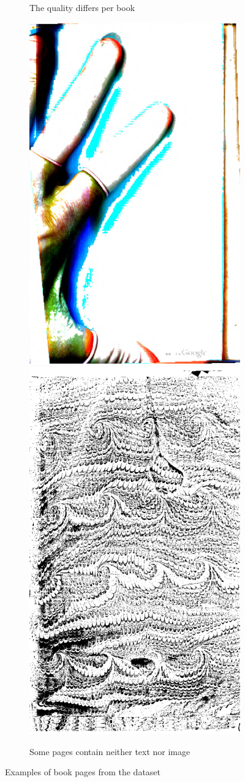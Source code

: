 \begin{figure}[H]
\begin{subfigure}[b]{0.49\textwidth}
		\caption{The quality differs per book}
		\label{fig:qualityExamples}
	\end{subfigure}
	\begin{subfigure}[b]{0.49\textwidth}
		\includegraphics[width=.49\textwidth]{resources/500_0002}
		\includegraphics[width=.49\textwidth]{resources/500_0004}
		\caption{Some pages contain neither text nor image}
		\label{fig:baggerExamples}
	\end{subfigure}
	\caption{Examples of book pages from the dataset}
	\label{fig:examples}
\end{figure}
\restoregeometry

